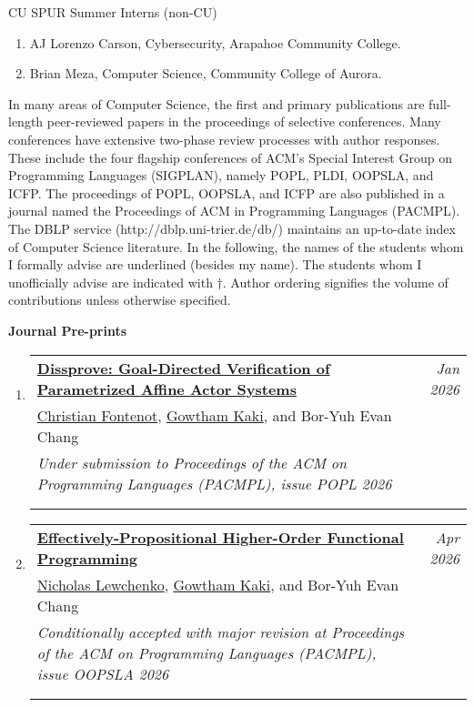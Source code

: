 \documentclass{article}
\makeatletter
\newenvironment{benumerate}[2]{
    \let\oldItem\item
    \def\item{\addtocounter{enumi}{-2}\oldItem}
    \begin{enumerate}[#2] \itemsep3pt
    \setcounter{enumi}{#1}
    \addtocounter{enumi}{1}}
  {\end{enumerate}}
\newenvironment{region}[3]{%
  {{\textbf{#1}}}
  \begin{benumerate}{#3}{\color{RoyalBlue}#2}}
  {\end{benumerate}\vspace{0.8ex}}
\newenvironment{publication}[6]
{ \item
  \begin{tabular*}{6.8in}{p{6in}@{\extracolsep{\fill}}r}
    \href{#1}{\textbf{#2}} & \textit{#3}\\ #4 &\\ \textit{#5}&\\
    \ifthenelse{\equal{#6}{}}{}{#6&\\}
  \end{tabular*}
} {}
\makeatother
\begin{document}
\noindent CU SPUR Summer Interns (non-CU)
\begin{enumerate}
  \item AJ Lorenzo Carson, Cybersecurity, Arapahoe Community College.
  \item Brian Meza, Computer Science, Community College of Aurora.
\end{enumerate}


\vspace{1em}
In many areas of Computer Science, the first and primary publications are
full-length peer-reviewed papers in the proceedings of selective
conferences. Many conferences have extensive two-phase review processes
with author responses. These include the four flagship conferences of ACM's
Special Interest Group on Programming Languages (SIGPLAN), namely POPL,
PLDI, OOPSLA, and ICFP. The proceedings of POPL, OOPSLA, and ICFP are also
published in a journal named the Proceedings of ACM in Programming
Languages (PACMPL). The DBLP service (http://dblp.uni-trier.de/db/)
maintains an up-to-date index of Computer Science literature. In the
following, the names of the students whom I formally advise are underlined
(besides my name). The students whom I unofficially advise are indicated
with $\dag$. Author ordering signifies the volume of contributions unless
otherwise specified. 


\newcommand{\ugkaki}{\underline{Gowtham Kaki}}
\newcommand{\bec}{Bor-Yuh Evan Chang}
\newcommand{\sj}{Suresh Jagannathan}

\vspace{1em}
\begin{region} {Journal Pre-prints}{{J}1}{9}

\begin{publication}{}
		{Dissprove: Goal-Directed Verification of Parametrized Affine Actor Systems}
    {Jan 2026}{\underline{Christian Fontenot}, \ugkaki, and \bec}
    {Under submission to Proceedings of the ACM on Programming Languages
    (PACMPL), issue POPL 2026}{}
\end{publication}

\begin{publication}{}
		{Effectively-Propositional Higher-Order Functional Programming}
    {Apr 2026}{\underline{Nicholas Lewchenko}, \ugkaki, and \bec}
		{Conditionally accepted with major revision at Proceedings of the ACM on Programming Languages (PACMPL), issue OOPSLA 2026}{}
\end{publication}

\end{region}
\end{document}
